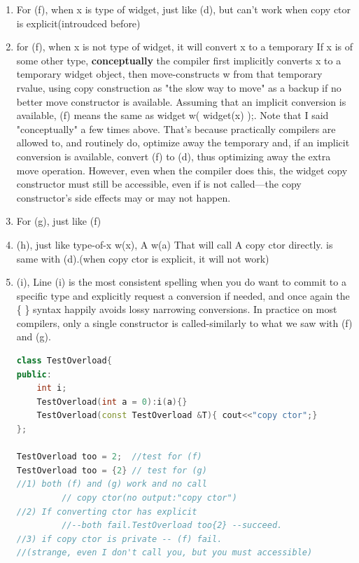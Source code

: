 \documentclass[a4paper,11pt,twoside]{book}
\begin{document}
\begin{itemize}
\begin{enumerate}
		\item For (f), when x is type of widget, just like (d), but can't work when copy ctor is explicit(introudced before)
		
		\item for (f), when x is not type of widget, it will convert x to a temporary If x is of some other type, \textbf{conceptually} the compiler first implicitly converts x to a temporary widget object, then move-constructs w from that temporary rvalue, using copy construction as "the slow way to move" as a backup if no better move constructor is available. Assuming that an implicit conversion is available, (f) means the same as widget w( widget(x) );. Note that I said "conceptually" a few times above. That's because practically compilers are allowed to, and routinely do, optimize away the temporary and, if an implicit conversion is available, convert (f) to (d), thus optimizing away the extra move operation. However, even when the compiler does this, the widget copy constructor must still be accessible, even if is not called—the copy constructor's side effects may or may not happen.

		\item For (g), just like (f)
		
		\item (h), just like type-of-x w(x), A w(a) That will call A copy ctor directly. is same with (d).(when copy ctor is explicit, it will not work)
		
		\item (i), Line (i) is the most consistent spelling when you do want to commit to a specific type and explicitly request a conversion if needed, and once again the \{ \} syntax happily avoids lossy narrowing conversions. In practice on most compilers, only a single constructor is called-similarly to what we saw with (f) and (g).
		
\begin{lstlisting}[frame=single, language=c++,mathescape=true]
class TestOverload{
public:
	int i;
	TestOverload(int a = 0):i(a){}
	TestOverload(const TestOverload &T){ cout<<"copy ctor";} 
};
		
TestOverload too = 2;  //test for (f) 
TestOverload too = {2} // test for (g)
//1) both (f) and (g) work and no call
         // copy ctor(no output:"copy ctor")
//2) If converting ctor has explicit 
         //--both fail.TestOverload too{2} --succeed.
//3) if copy ctor is private -- (f) fail.
//(strange, even I don't call you, but you must accessible)
		

\end{lstlisting}
\end{enumerate}
\end{itemize}
\end{document}
